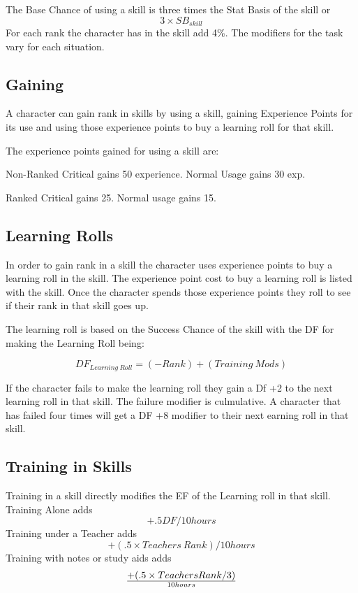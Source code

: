 The Base Chance of using a skill is three times the Stat Basis of the skill
or \[ 3 \times SB_{skill} \] For each rank the character has in the skill add 4\%.
The modifiers for the task vary for each situation.


\subsection{Gaining}
A character can gain rank in skills by using a skill, gaining Experience Points
for its use and using those experience points to buy a learning roll for that
skill. 

The experience points gained for using a skill are:

\begin{relate}
	\item[Non-Ranked] Critical gains 50 experience. Normal Usage gains 30 exp.
	\item[Ranked] Critical gains 25. Normal usage gains 15.
\end{relate}

\subsection{Learning Rolls}

In order to gain rank in a skill the character uses experience points to
buy a learning roll in the skill. The experience point cost to buy a learning roll
is listed with the skill. Once the character spends
those experience points they roll to see if their rank in that
skill goes up.

The learning roll is based on the Success Chance of the skill with the  
DF for making the Learning Roll being: 

\[DF_{Learning\ Roll} = (-Rank) + ({Training\ Mods})\]

If the character fails to make the learning roll they gain a Df +2 to the next 
learning roll in that skill. The failure modifier is culmulative. A character
that has failed four times will get a DF +8 modifier to their next earning roll
in that skill.

\subsection{Training in Skills}

{Training} in a skill directly modifies the EF of the Learning roll in
that skill. Training Alone adds \[+.5 DF/10 hours\] 
Training under a Teacher adds \[+(.5 \times {Teachers\ Rank})/10 hours\]
Training with notes or study aids adds \[+(.5 \times {Teachers Rank}/3) \over {10 hours}\]

